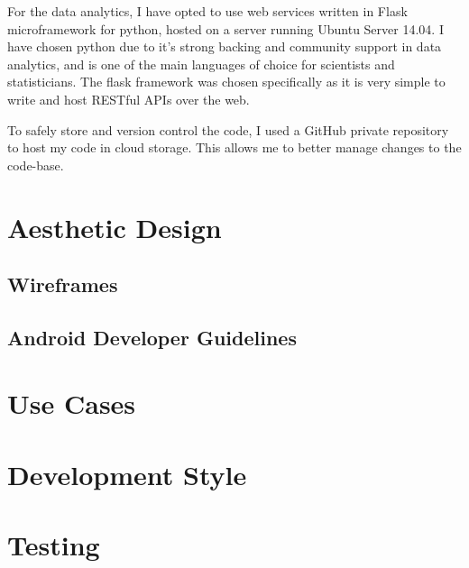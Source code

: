 For the data analytics, I have opted to use web services written in Flask microframework for python, hosted on a server running Ubuntu Server 14.04. 
I have chosen python due to it's strong backing and community support in data analytics, and is one of the main languages of choice for scientists and statisticians.
The flask framework was chosen specifically as it is very simple to write and host RESTful APIs over the web.

To safely store and version control the code, I used a GitHub private repository to host my code in cloud storage. 
This allows me to better manage changes to the code-base. 

\section{Aesthetic Design}

\subsection{Wireframes}

\subsection{Android Developer Guidelines}
\section{Use Cases}	

\section{Development Style}

\section{Testing}

